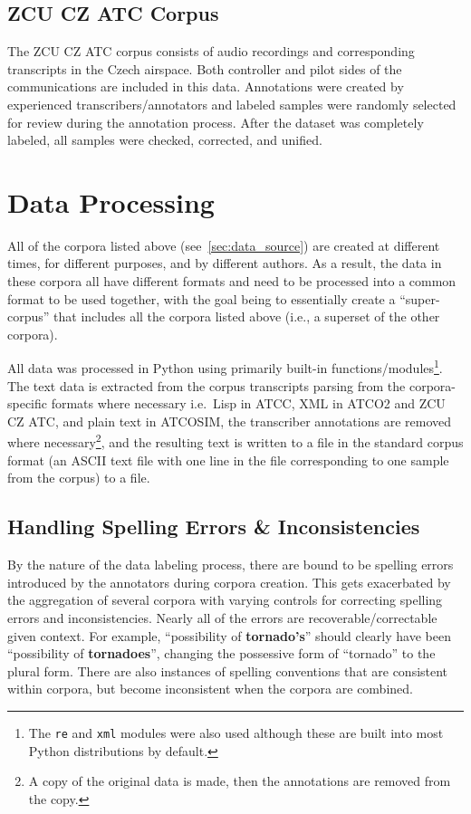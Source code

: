 \documentclass[12pt]{article}
\begin{document}
\subsection{ZCU CZ ATC Corpus}\label{sec:zcu_atc}
The ZCU CZ ATC corpus consists of audio recordings and corresponding transcripts in the Czech airspace. Both controller and pilot sides of the
communications are included in this data. Annotations were created by experienced transcribers/annotators and labeled samples were randomly selected
for review during the annotation process. After the dataset was completely labeled, all samples were checked, corrected, and
unified\cite{smidl_air_2019}.

\section{Data Processing}\label{sec:data_processing}
All of the corpora listed above (see~\ref{sec:data_source}) are created at different times, for different purposes, and by different authors.
As a result, the data in these corpora all have different formats and need to be processed into a common format to be used together, with the goal
being to essentially create a ``super-corpus'' that includes all the corpora listed above (i.e., a superset of the other corpora).

All data was processed in Python using primarily built-in functions/modules\footnote{The \lstinline|re| and \lstinline|xml| modules were also used
    although these are built into most Python distributions by default.}. The text data is extracted from the corpus transcripts parsing from the
corpora-specific formats where necessary i.e.~Lisp in ATCC, XML in ATCO2 and ZCU CZ ATC, and plain text in ATCOSIM, the transcriber annotations
are removed where necessary\footnote{A copy of the original data is made, then the annotations are removed from the copy.}, and the resulting text
is written to a file in the standard corpus format (an ASCII text file with one line in the file corresponding to one sample from the corpus) to a
file.

\subsection{Handling Spelling Errors \& Inconsistencies}\label{sec:spelling_errors}
By the nature of the data labeling process, there are bound to be spelling errors introduced by the annotators during corpora creation. This gets
exacerbated by the aggregation of several corpora with varying controls for correcting spelling errors and inconsistencies. Nearly all of the errors
are recoverable/correctable given context. For example, ``possibility of \textbf{tornado's}'' should clearly have been
``possibility of \textbf{tornadoes}'', changing the possessive form of ``tornado'' to the plural form. There are also instances of spelling conventions
that are consistent within corpora, but become inconsistent when the corpora are combined.
\end{document}
